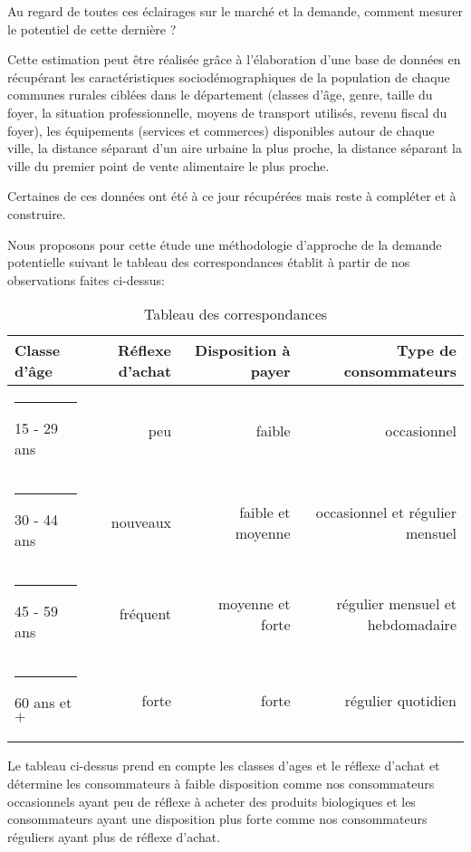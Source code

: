 \documentclass[12pt,a4paper]{report}
\begin{document}
	Au regard de toutes ces éclairages sur le marché et la demande, comment mesurer le potentiel de cette dernière ? 
	
	Cette estimation peut être réalisée grâce à l'élaboration d'une base de données en récupérant les caractéristiques sociodémographiques de la population de chaque communes rurales ciblées dans le département (classes d’âge, genre, taille du foyer, la situation professionnelle, moyens de transport utilisés, revenu fiscal du foyer), les équipements  (services et commerces) disponibles autour de chaque ville, la distance séparant d’un aire urbaine la plus proche, la distance séparant la ville du premier point de vente alimentaire le plus proche. 
	
	Certaines de ces données ont été à ce jour récupérées mais reste à compléter et à construire.
	
	Nous proposons pour cette étude une méthodologie d'approche de la demande potentielle suivant le tableau des correspondances établit à partir de nos observations faites ci-dessus:	\\
	
	\begin{table}[htbp]
		\centering
		\caption{\color{green}Tableau des correspondances}
		\vspace{0.3cm}
		\begin{tabular}{l|r|r|r}
			
			\textbf{Classe d'âge}& \textbf{Réflexe d'achat} & \textbf{Disposition à payer} & \textbf{Type de consommateurs}\\ \hline
			\rule[0.5cm]{-0.1cm}{0cm}
			15 - 29 ans & peu & faible  & occasionnel   \\
			\rule[0.5cm]{-0.1cm}{0cm}
			30 - 44 ans & nouveaux & faible et moyenne & occasionnel et régulier mensuel\\
			\rule[0.5cm]{-0.1cm}{0cm}
			45 - 59 ans & fréquent & moyenne et forte & régulier mensuel et hebdomadaire  \\
			\rule[0.5cm]{-0.1cm}{0cm}
			60 ans et $+$ & forte & forte & régulier quotidien  \\ 

			
		\end{tabular}%
		\label{tab:addlabel}%
	\end{table}%
	\vspace{0.5cm}
	
		
	Le tableau ci-dessus prend en compte les classes d'ages et le réflexe d'achat et détermine les consommateurs à faible disposition comme nos consommateurs occasionnels ayant peu de réflexe à acheter des produits biologiques et les consommateurs ayant une disposition plus forte comme nos consommateurs réguliers ayant plus de réflexe d'achat.\\	
\end{document}
